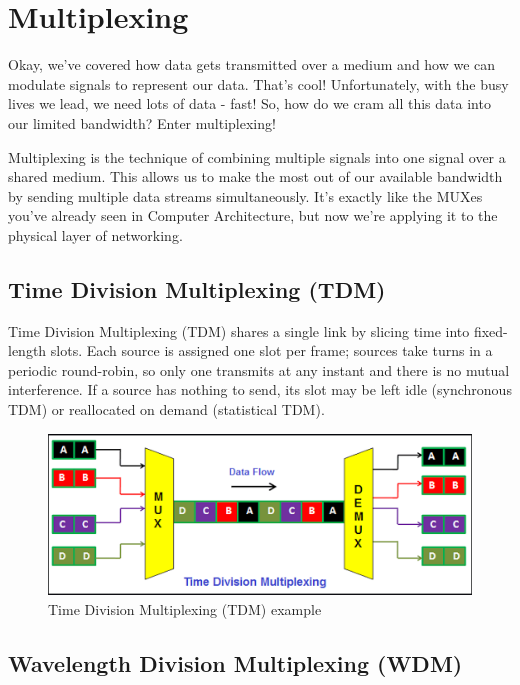 \newpage
\section{Multiplexing}\label{sec:multiplexing}
Okay, we've covered how data gets transmitted over a medium and how we can modulate signals to represent our data. That's cool! Unfortunately, with the busy lives we lead, we need lots of data - fast! So, how do we cram all this data into our limited bandwidth? Enter multiplexing!

Multiplexing is the technique of combining multiple signals into one signal over a shared medium. This allows us to make the most out of our available bandwidth by sending multiple data streams simultaneously. It's exactly like the MUXes you've already seen in Computer Architecture, but now we're applying it to the physical layer of networking.

\subsection{Time Division Multiplexing (TDM)}
\label{subsec:tdm}
Time Division Multiplexing (TDM) shares a single link by slicing time into fixed-length slots. Each source is assigned one slot per frame; sources take turns in a periodic round-robin, so only one transmits at any instant and there is no mutual interference. If a source has nothing to send, its slot may be left idle (synchronous TDM) or reallocated on demand (statistical TDM).

\begin{figure}[h]
    \centering
    \includegraphics[width=.8\textwidth]{assets/osi/physical/multiplexing/tdm.png}
    \caption{Time Division Multiplexing (TDM) example}
    \label{fig:tdm_example}
\end{figure}


\subsection{Wavelength Division Multiplexing (WDM)}
\label{subsec:wdm}

